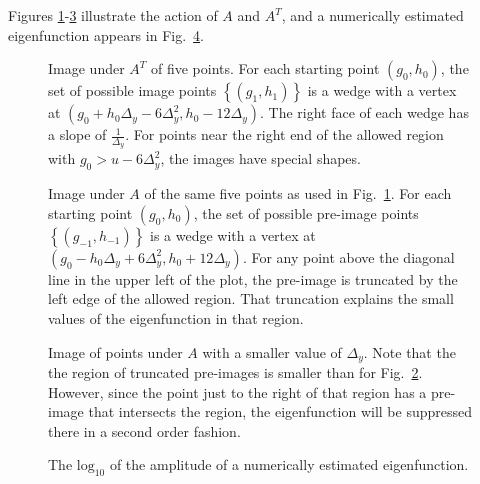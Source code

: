 \documentclass[twocolumn]{article}
\begin{document}
Figures \ref{fig:Av1}-\ref{fig:Av3} illustrate the action of $A$ and
$A^T$, and a numerically estimated eigenfunction appears in
Fig.~\ref{fig:eigenfunction}.
\begin{figure}
  \centering
    \caption{Image under $A^T$ of five points.  For each starting
      point $(g_0,h_0)$, the set of possible image points $\left\{
        (g_1,h_1) \right\}$ is a wedge with a vertex at
      $(g_0+h_0\Delta_y - 6\Delta_y^2,h_0 - 12\Delta_y)$.  The right
      face of each wedge has a slope of $\frac{1}{\Delta_y}$.  For
      points near the right end of the allowed region with $g_0 > u -
      6 \Delta_y^2$, the images have special shapes.}
  \label{fig:Av1}
\end{figure}

\begin{figure}
  \centering
    \caption{Image under $A$ of the same five points as used in
      Fig.~\ref{fig:Av1}.  For each starting point $(g_0,h_0)$, the
      set of possible pre-image points $\left\{ (g_{-1},h_{-1})
      \right\}$ is a wedge with a vertex at $(g_0-h_0\Delta_y +
      6\Delta_y^2,h_0 + 12\Delta_y)$.  For any point above the
      diagonal line in the upper left of the plot, the pre-image is
      truncated by the left edge of the allowed region.  That
      truncation explains the small values of the eigenfunction in
      that region.}
  \label{fig:Av2}
\end{figure}

\begin{figure}
  \centering
    \caption{Image of points under $A$ with a smaller value of
      $\Delta_y$.  Note that the the region of truncated pre-images is
      smaller than for Fig.~\ref{fig:Av2}.  However, since the point
      just to the right of that region has a pre-image that intersects
      the region, the eigenfunction will be suppressed there in a second
      order fashion.}
  \label{fig:Av3}
\end{figure}

\begin{figure}
  \centering
    \caption{The $\text{log}_{10}$ of the amplitude of a numerically
      estimated eigenfunction.}
  \label{fig:eigenfunction}
\end{figure}
\end{document}
